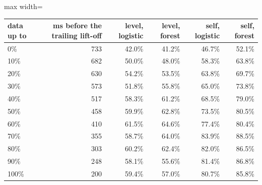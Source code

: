 \begin{adjustbox}{max width=\textwidth}
{\footnotesize
\begin{tabular}{lrrrrr}
\toprule
\textbf{data up to} & \textbf{ms before the trailing lift-off} & \textbf{level, logistic} & \textbf{level, forest} & \textbf{self, logistic} & \textbf{self, forest} \\
\midrule
0\% & 733 & 42.0\% & 41.2\% & 46.7\% & 52.1\% \\
10\% & 682 & 50.0\% & 48.0\% & 58.3\% & 63.8\% \\
20\% & 630 & 54.2\% & 53.5\% & 63.8\% & 69.7\% \\
30\% & 573 & 51.8\% & 55.8\% & 65.0\% & 73.8\% \\
40\% & 517 & 58.3\% & 61.2\% & 68.5\% & 79.0\% \\
50\% & 458 & 59.9\% & 62.8\% & 73.5\% & 80.5\% \\
60\% & 410 & 61.5\% & 64.6\% & 77.4\% & 80.4\% \\
70\% & 355 & 58.7\% & 64.0\% & 83.9\% & 88.5\% \\
80\% & 303 & 60.2\% & 62.4\% & 82.0\% & 86.5\% \\
90\% & 248 & 58.1\% & 55.6\% & 81.4\% & 86.8\% \\
100\% & 200 & 59.4\% & 57.0\% & 80.7\% & 85.8\% \\
\bottomrule
\end{tabular}
}
\end{adjustbox}
